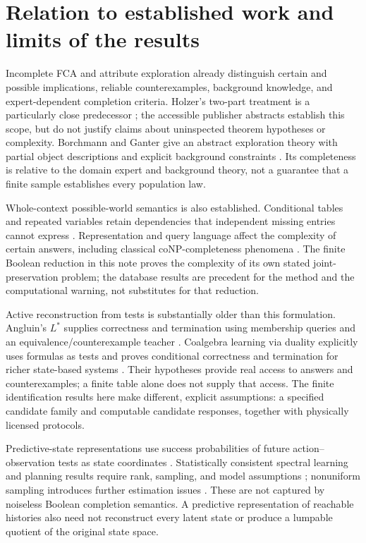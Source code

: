 \documentclass[11pt]{article}
\theoremstyle{definition}
\begin{document}
\section{Relation to established work and limits of the results}
\label{sec:prior-art}

Incomplete FCA and attribute exploration already distinguish certain and
possible implications, reliable counterexamples, background knowledge, and
expert-dependent completion criteria. Holzer's two-part treatment is a
particularly close predecessor \cite{HolzerI,HolzerII}; the accessible
publisher abstracts establish this scope, but do not justify claims about
uninspected theorem hypotheses or complexity. Borchmann and Ganter give an
abstract exploration theory with partial object descriptions and explicit
background constraints \cite{BorchmannGanter}. Its completeness is relative
to the domain expert and background theory, not a guarantee that a finite
sample establishes every population law.

Whole-context possible-world semantics is also established. Conditional
tables and repeated variables retain dependencies that independent missing
entries cannot express \cite{ImielinskiLipski}. Representation and query
language affect the complexity of certain answers, including classical
coNP-completeness phenomena \cite{AbiteboulKanellakisGrahne}. The finite
Boolean reduction in this note proves the complexity of its own stated
joint-preservation problem; the database results are precedent for the
method and the computational warning, not substitutes for that reduction.

Active reconstruction from tests is substantially older than this
formulation. Angluin's $L^*$ supplies correctness and termination using
membership queries and an equivalence/counterexample teacher
\cite{Angluin}. Coalgebra learning via duality explicitly uses formulas as
tests and proves conditional correctness and termination for richer
state-based systems \cite{BarloccoKupkeRot}. Their hypotheses provide real
access to answers and counterexamples; a finite table alone does not
supply that access. The finite identification results here make different,
explicit assumptions: a specified candidate family and computable
candidate responses, together with physically licensed protocols.

Predictive-state representations use success probabilities of future
action--observation tests as state coordinates \cite{LittmanSuttonSingh}.
Statistically consistent spectral learning and planning results require
rank, sampling, and model assumptions \cite{BootsSiddiqiGordon}; nonuniform
sampling introduces further estimation issues \cite{GrinbergEtAl}. These
are not captured by noiseless Boolean completion semantics. A predictive
representation of reachable histories also need not reconstruct every
latent state or produce a lumpable quotient of the original state space.
\end{document}
